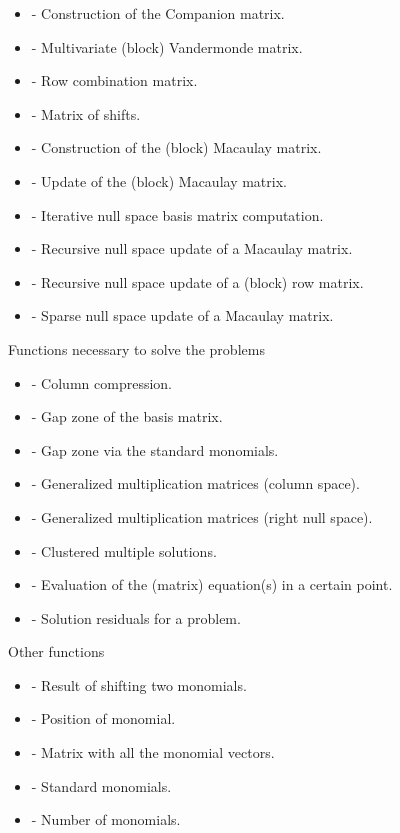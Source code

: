 \documentclass{manual}
\begin{document}
        \begin{itemize}
            \item {} - Construction of the Companion matrix.
            \item {} - Multivariate (block) Vandermonde matrix.
            \item {} - Row combination matrix.
            \item {} - Matrix of shifts.
            \item {} - Construction of the (block) Macaulay matrix.
            \item {} - Update of the (block) Macaulay matrix.
            \item {} - Iterative null space basis matrix computation.
            \item {} - Recursive null space update of a Macaulay matrix.
            \item {} - Recursive null space update of a (block) row matrix.
            \item {} - Sparse null space update of a Macaulay matrix.
        \end{itemize}
        \noindent Functions necessary to solve the problems
        \begin{itemize}
            \item {} - Column compression.
            \item {} - Gap zone of the basis matrix.
            \item {} - Gap zone via the standard monomials.
            \item {} - Generalized multiplication matrices (column space).
            \item {} - Generalized multiplication matrices (right null space).
            \item {} - Clustered multiple solutions.
            \item {} - Evaluation of the (matrix) equation(s) in a certain point.
            \item {} - Solution residuals for a problem.
        \end{itemize}
        \noindent Other functions
        \begin{itemize}
            \item {} - Result of shifting two monomials.
            \item {} - Position of monomial.
            \item {} - Matrix with all the monomial vectors.
            \item {} - Standard monomials.
            \item {} - Number of monomials.  
        \end{itemize}
\end{document}
